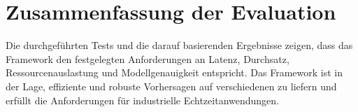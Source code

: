 \section{Zusammenfassung der Evaluation}
Die durchgeführten Tests und die darauf basierenden Ergebnisse zeigen, dass das Framework den festgelegten Anforderungen an Latenz, 
Durchsatz, Ressourcenauslastung und Modellgenauigkeit entspricht. Das Framework ist in der Lage, effiziente und robuste Vorhersagen 
auf verschiedenen \Emb zu liefern und erfüllt die Anforderungen für industrielle Echtzeitanwendungen.